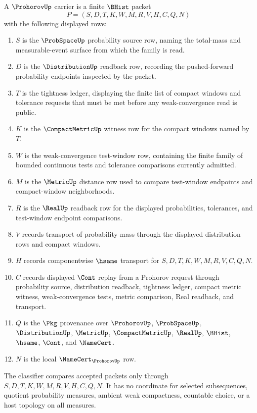\begin{definition}
\label{def:prohorov-carrier}
A $\ProhorovUp$ carrier is a finite $\BHist$ packet
$$
P=(S,D,T,K,W,M,R,V,H,C,Q,N)
$$
with the following displayed rows:
\begin{enumerate}
\item $S$ is the $\ProbSpaceUp$ probability source row, naming the total-mass and measurable-event surface from which the family is read.
\item $D$ is the $\DistributionUp$ readback row, recording the pushed-forward probability endpoints inspected by the packet.
\item $T$ is the tightness ledger, displaying the finite list of compact windows and tolerance requests that must be met before any weak-convergence read is public.
\item $K$ is the $\CompactMetricUp$ witness row for the compact windows named by $T$.
\item $W$ is the weak-convergence test-window row, containing the finite family of bounded continuous tests and tolerance comparisons currently admitted.
\item $M$ is the $\MetricUp$ distance row used to compare test-window endpoints and compact-window neighborhoods.
\item $R$ is the $\RealUp$ readback row for the displayed probabilities, tolerances, and test-window endpoint comparisons.
\item $V$ records transport of probability mass through the displayed distribution rows and compact windows.
\item $H$ records componentwise $\hsame$ transport for $S,D,T,K,W,M,R,V,C,Q,N$.
\item $C$ records displayed $\Cont$ replay from a Prohorov request through probability source, distribution readback, tightness ledger, compact metric witness, weak-convergence tests, metric comparison, Real readback, and transport.
\item $Q$ is the $\Pkg$ provenance over $\ProhorovUp$, $\ProbSpaceUp$, $\DistributionUp$, $\MetricUp$, $\CompactMetricUp$, $\RealUp$, $\BHist$, $\hsame$, $\Cont$, and $\NameCert$.
\item $N$ is the local $\NameCert_{\ProhorovUp}$ row.
\end{enumerate}
The classifier compares accepted packets only through $S,D,T,K,W,M,R,V,H,C,Q,N$. It has no coordinate for selected subsequences, quotient probability measures, ambient weak compactness, countable choice, or a host topology on all measures.
\end{definition}

